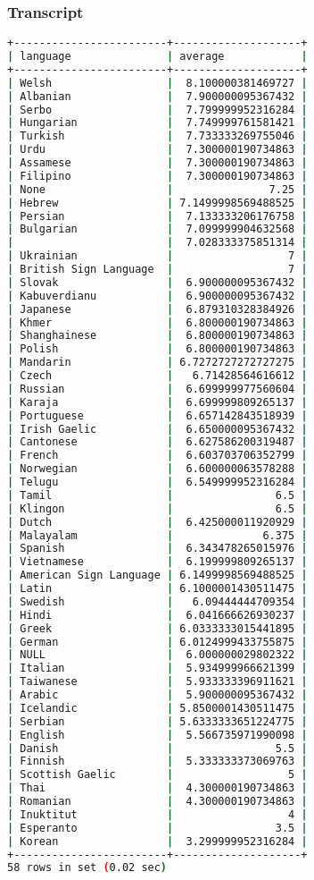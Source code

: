 \subsubsection{Transcript}
\begin{lstlisting}[language=bash]
+------------------------+--------------------+
| language               | average            |
+------------------------+--------------------+
| Welsh                  |  8.100000381469727 |
| Albanian               |  7.900000095367432 |
| Serbo                  |  7.799999952316284 |
| Hungarian              |  7.749999761581421 |
| Turkish                |  7.733333269755046 |
| Urdu                   |  7.300000190734863 |
| Assamese               |  7.300000190734863 |
| Filipino               |  7.300000190734863 |
| None                   |               7.25 |
| Hebrew                 | 7.1499998569488525 |
| Persian                |  7.133333206176758 |
| Bulgarian              |  7.099999904632568 |
|                        |  7.028333375851314 |
| Ukrainian              |                  7 |
| British Sign Language  |                  7 |
| Slovak                 |  6.900000095367432 |
| Kabuverdianu           |  6.900000095367432 |
| Japanese               |  6.879310328384926 |
| Khmer                  |  6.800000190734863 |
| Shanghainese           |  6.800000190734863 |
| Polish                 |  6.800000190734863 |
| Mandarin               | 6.7272727272727275 |
| Czech                  |   6.71428564616612 |
| Russian                |  6.699999977560604 |
| Karaja                 |  6.699999809265137 |
| Portuguese             |  6.657142843518939 |
| Irish Gaelic           |  6.650000095367432 |
| Cantonese              |  6.627586200319487 |
| French                 |  6.603703706352799 |
| Norwegian              |  6.600000063578288 |
| Telugu                 |  6.549999952316284 |
| Tamil                  |                6.5 |
| Klingon                |                6.5 |
| Dutch                  |  6.425000011920929 |
| Malayalam              |              6.375 |
| Spanish                |  6.343478265015976 |
| Vietnamese             |  6.199999809265137 |
| American Sign Language | 6.1499998569488525 |
| Latin                  | 6.1000001430511475 |
| Swedish                |   6.09444444709354 |
| Hindi                  |  6.041666626930237 |
| Greek                  | 6.0333333015441895 |
| German                 | 6.0124999433755875 |
| NULL                   |  6.000000029802322 |
| Italian                |  5.934999966621399 |
| Taiwanese              |  5.933333396911621 |
| Arabic                 |  5.900000095367432 |
| Icelandic              | 5.8500001430511475 |
| Serbian                | 5.6333333651224775 |
| English                |  5.566735971990098 |
| Danish                 |                5.5 |
| Finnish                |  5.333333373069763 |
| Scottish Gaelic        |                  5 |
| Thai                   |  4.300000190734863 |
| Romanian               |  4.300000190734863 |
| Inuktitut              |                  4 |
| Esperanto              |                3.5 |
| Korean                 |  3.299999952316284 |
+------------------------+--------------------+
58 rows in set (0.02 sec)
\end{lstlisting}


